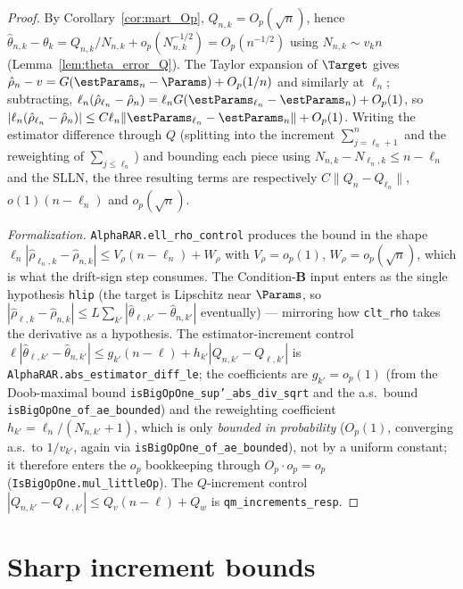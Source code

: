 \begin{proof}\leanok
{}
By Corollary~\ref{cor:mart_Op}, $Q_{n,k}=O_p(\sqrt n)$, hence
$\hat{\theta}_{n,k}-\theta_k = Q_{n,k}/N_{n,k} + o_p(N_{n,k}^{-1/2}) = O_p(n^{-1/2})$
using $N_{n,k}\sim v_k n$ (Lemma~\ref{lem:theta_error_Q}). The Taylor expansion of
$\Target$ gives $\hat{\rho}_n - v = G(\estParams_n-\Params)+O_p(1/n)$ and similarly
at $\ell_n$; subtracting,
$\ell_n(\hat{\rho}_{\ell_n}-\hat{\rho}_n)
 = \ell_n G(\estParams_{\ell_n}-\estParams_n) + O_p(1)$, so
$|\ell_n(\hat{\rho}_{\ell_n}-\hat{\rho}_n)| \le C\ell_n\|\estParams_{\ell_n}-\estParams_n\| + O_p(1)$.
Writing the estimator difference through $Q$ (splitting into the increment
$\sum_{j=\ell_n+1}^n$ and the reweighting of $\sum_{j\le\ell_n}$) and bounding
each piece using $N_{n,k}-N_{\ell_n,k}\le n-\ell_n$ and the SLLN, the three
resulting terms are respectively $C\|Q_n-Q_{\ell_n}\|$, $o(1)(n-\ell_n)$ and
$o_p(\sqrt n)$.

\emph{Formalization.} \texttt{AlphaRAR.ell\_rho\_control} produces the bound in the shape
$\ell_n|\hat\rho_{\ell_n,k}-\hat\rho_{n,k}| \le V_\rho(n-\ell_n)+W_\rho$ with $V_\rho=o_p(1)$,
$W_\rho=o_p(\sqrt n)$, which is what the drift-sign step consumes. The Condition-\textbf{B} input
enters as the single hypothesis \texttt{hlip} (the target is Lipschitz near $\Params$, so
$|\hat\rho_{\ell,k}-\hat\rho_{n,k}|\le L\sum_{k'}|\hat\theta_{\ell,k'}-\hat\theta_{n,k'}|$
eventually) --- mirroring how \texttt{clt\_rho} takes the derivative as a hypothesis. The
estimator-increment control $\ell|\hat\theta_{\ell,k'}-\hat\theta_{n,k'}|\le g_{k'}(n-\ell)+h_{k'}
|Q_{n,k'}-Q_{\ell,k'}|$ is \texttt{AlphaRAR.abs\_estimator\_diff\_le}; the coefficients are
$g_{k'}=o_p(1)$ (from the Doob-maximal bound \texttt{isBigOpOne\_sup'\_abs\_div\_sqrt} and the a.s.\
bound \texttt{isBigOpOne\_of\_ae\_bounded}) and the reweighting coefficient
$h_{k'}=\ell_n/(N_{n,k'}+1)$, which is only \emph{bounded in probability} ($O_p(1)$, converging a.s.\
to $1/v_{k'}$, again via \texttt{isBigOpOne\_of\_ae\_bounded}), not by a uniform constant; it
therefore enters the $o_p$ bookkeeping through $O_p\cdot o_p=o_p$
(\texttt{IsBigOpOne.mul\_littleOp}). The $Q$-increment control
$|Q_{n,k'}-Q_{\ell,k'}|\le Q_v(n-\ell)+Q_w$ is \texttt{qm\_increments\_resp}.
\end{proof}

\section{Sharp increment bounds}
\label{sec:norm_bounds}

